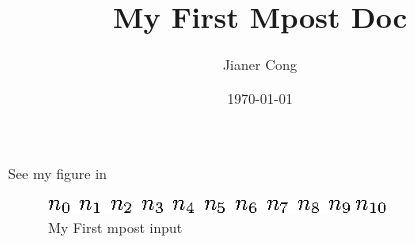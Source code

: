 \documentclass{article}
\title{My First Mpost Doc}
\author{Jianer Cong}
\date{\today}
\begin{document}
\maketitle
See my figure in 
\begin{figure}[ht]
  \centering
  \includegraphics[width=0.8\textwidth]{n-latex-labs.eps}
  \caption{My First mpost input}
\end{figure}
\end{document}
